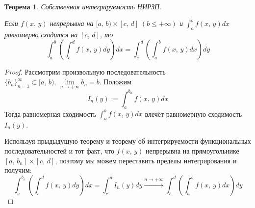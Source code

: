 \documentclass[a4paper,12pt]{article}
\renewcommand{\leq}{\ensuremath{\leqslant}}
\theoremstyle{plain}
\newtheorem{theorem}{Теорема}[section]
\theoremstyle{definition}
\theoremstyle{remark}
\begin{document}
\begin{theorem}
	Собственная интегрируемость НИРЗП.

	Если $f(x,\,y)$ непрерывна на $[a,\,b) \times [c,\,d]\;(b \leq +\infty)$ и $\int_a^b f(x,\,y)dx$ равномерно сходится на $[c,\,d]$, то
	\[\int_a^b \left(\int_c^d f(x,\,y)dy\right)dx = \int_c^d\left(\int_a^b f(x,\,y)dx\right)dy\]
\end{theorem}
\begin{proof}
	Рассмотрим произвольную последовательность $\{b_n\}_{n = 1}^\infty \subset [a,\,b),\, \lim\limits_{n\to +\infty} b_n = b$. Положим
	\[I_n(y) := \int_a^{b_n}f(x,\,y)dx\]
	Тогда равномерная сходимость $\int_a^b f(x,\,y)dx$ влечёт равномерную сходимость $I_n(y)$. 
	
	Используя прыдыдущую теорему и теорему об интегрируемости функциональных последовательностей и тот факт, что $f(x,\,y)$ непрерывна на прямоугольнике $[a,\,b_n]\times [c,\,d]$, поэтому мы можем переставить пределы интегрирования и получим:
	\[\int_a^{b_n}\left(\int_c^d f(x,\,y)dy\right)dx = \int_c^d I_n(y)dy \stackrel{n \to +\infty}{\to} \int_c^d \left(\int_a^b f(x,\,y)dx\right)dy\]
\end{proof}
\end{document}
